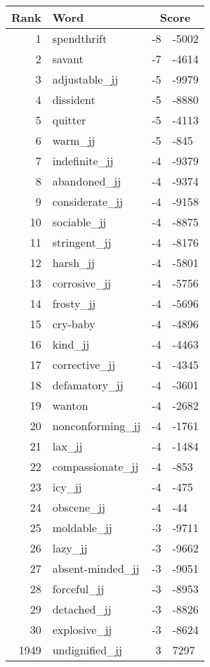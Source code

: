 \begin{longtable}[!htbp]{| rlr@{.}l |}
    \hline
    \textbf{Rank} & \textbf{Word} & \multicolumn{2}{c|}{\textbf{Score}} \\
    \hline
    \endhead
    1 & spendthrift & -8 & -5002 \\
    2 & savant & -7 & -4614 \\
    3 & adjustable\_jj & -5 & -9979 \\
    4 & dissident & -5 & -8880 \\
    5 & quitter & -5 & -4113 \\
    6 & warm\_jj & -5 & -845 \\
    7 & indefinite\_jj & -4 & -9379 \\
    8 & abandoned\_jj & -4 & -9374 \\
    9 & considerate\_jj & -4 & -9158 \\
    10 & sociable\_jj & -4 & -8875 \\
    11 & stringent\_jj & -4 & -8176 \\
    12 & harsh\_jj & -4 & -5801 \\
    13 & corrosive\_jj & -4 & -5756 \\
    14 & frosty\_jj & -4 & -5696 \\
    15 & cry-baby & -4 & -4896 \\
    16 & kind\_jj & -4 & -4463 \\
    17 & corrective\_jj & -4 & -4345 \\
    18 & defamatory\_jj & -4 & -3601 \\
    19 & wanton & -4 & -2682 \\
    20 & nonconforming\_jj & -4 & -1761 \\
    21 & lax\_jj & -4 & -1484 \\
    22 & compassionate\_jj & -4 & -853 \\
    23 & icy\_jj & -4 & -475 \\
    24 & obscene\_jj & -4 & -44 \\
    25 & moldable\_jj & -3 & -9711 \\
    26 & lazy\_jj & -3 & -9662 \\
    27 & absent-minded\_jj & -3 & -9051 \\
    28 & forceful\_jj & -3 & -8953 \\
    29 & detached\_jj & -3 & -8826 \\
    30 & explosive\_jj & -3 & -8624 \\
    1949 & undignified\_jj & 3 & 7297 \\

\end{longtable}
